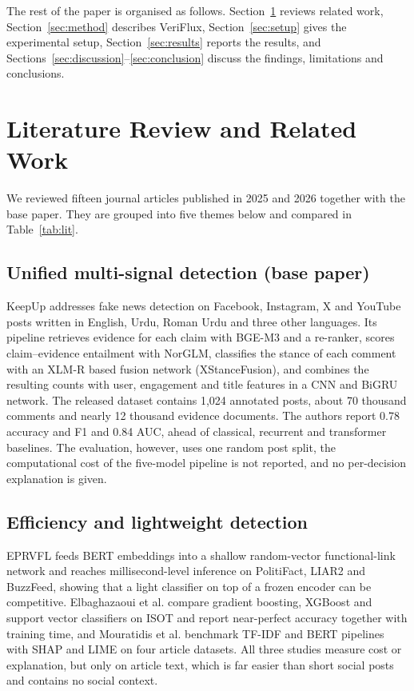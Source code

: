 \documentclass[conference]{IEEEtran}
\begin{document}
The rest of the paper is organised as follows. Section~\ref{sec:lit} reviews related work,
Section~\ref{sec:method} describes VeriFlux, Section~\ref{sec:setup} gives the experimental setup,
Section~\ref{sec:results} reports the results, and Sections~\ref{sec:discussion}--\ref{sec:conclusion}
discuss the findings, limitations and conclusions.

\section{Literature Review and Related Work}
\label{sec:lit}
We reviewed fifteen journal articles published in 2025 and 2026 together with the base paper. They are
grouped into five themes below and compared in Table~\ref{tab:lit}.

\subsection{Unified multi-signal detection (base paper)}
KeepUp \cite{wasim2026keepup} addresses fake news detection on Facebook, Instagram, X and YouTube posts
written in English, Urdu, Roman Urdu and three other languages. Its pipeline retrieves evidence for each
claim with BGE-M3 and a re-ranker, scores claim--evidence entailment with NorGLM, classifies the stance of each
comment with an XLM-R based fusion network (XStanceFusion), and combines the resulting counts with user,
engagement and title features in a CNN and BiGRU network. The released dataset contains 1,024 annotated posts,
about 70 thousand comments and nearly 12 thousand evidence documents. The authors report 0.78 accuracy and F1
and 0.84 AUC, ahead of classical, recurrent and transformer baselines. The evaluation, however, uses one random
post split, the computational cost of the five-model pipeline is not reported, and no per-decision explanation
is given.

\subsection{Efficiency and lightweight detection}
EPRVFL \cite{gurjwar2025eprvfl} feeds BERT embeddings into a shallow random-vector functional-link network and
reaches millisecond-level inference on PolitiFact, LIAR2 and BuzzFeed, showing that a light classifier on top of
a frozen encoder can be competitive. Elbaghazaoui et al. \cite{elbaghazaoui2025comparative} compare gradient
boosting, XGBoost and support vector classifiers on ISOT and report near-perfect accuracy together with training
time, and Mouratidis et al. \cite{mouratidis2025misinformation} benchmark TF-IDF and BERT pipelines with SHAP and
LIME on four article datasets. All three studies measure cost or explanation, but only on article text, which
is far easier than short social posts and contains no social context.
\end{document}
